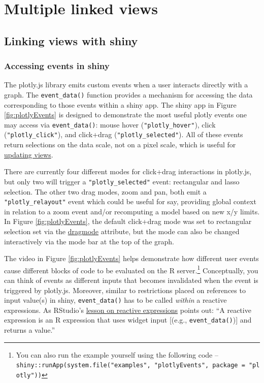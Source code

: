 \documentclass[12pt,]{isuthesis}
\let\rmarkdownfootnote\footnote%
\def\footnote{\protect\rmarkdownfootnote}
\begin{document}
\hypertarget{multiple-linked-views}{\section{Multiple linked
views}\label{multiple-linked-views}}

\hypertarget{linking-views-with-shiny}{\subsection{Linking views with
shiny}\label{linking-views-with-shiny}}

\subsubsection{Accessing events in
shiny}\label{accessing-events-in-shiny}

The plotly.js library emits custom events when a user interacts directly
with a graph. The \texttt{event\_data()} function provides a mechanism
for accessing the data corresponding to those events within a shiny app.
The shiny app in Figure \ref{fig:plotlyEvents} is designed to
demonstrate the most useful plotly events one may access via
\texttt{event\_data()}: mouse hover (\texttt{"plotly\_hover"}), click
(\texttt{"plotly\_click"}), and click+drag
(\texttt{"plotly\_selected"}). All of these events return selections on
the data scale, not on a pixel scale, which is useful for
\protect\hyperlink{updating-views}{updating views}.

There are currently four different modes for click+drag interactions in
plotly.js, but only two will trigger a \texttt{"plotly\_selected"}
event: rectangular and lasso selection. The other two drag modes, zoom
and pan, both emit a \texttt{"plotly\_relayout"} event which could be
useful for say, providing global context in relation to a zoom event
and/or recomputing a model based on new x/y limits. In Figure
\ref{fig:plotlyEvents}, the default click+drag mode was set to
rectangular selection set via the
\href{https://plot.ly/r/reference/\#layout-dragmode}{dragmode}
attribute, but the mode can also be changed interactively via the mode
bar at the top of the graph.

The video in Figure \ref{fig:plotlyEvents} helps demonstrate how
different user events cause different blocks of code to be evaluated on
the R server.\footnote{You can also run the example yourself using the
  following code --
  \texttt{shiny::runApp(system.file("examples",\ "plotlyEvents",\ package\ =\ "plotly"))}}
Conceptually, you can think of events as different inputs that becomes
invalidated when the event is triggered by plotly.js. Moreover, similar
to restrictions placed on references to input value(s) in shiny,
\texttt{event\_data()} has to be called \emph{within} a reactive
expressions. As RStudio's
\href{http://web.archive.org/web/20160405081516/http://shiny.rstudio.com/tutorial/lesson6/}{lesson
on reactive expressions} points out: ``A reactive expression is an R
expression that uses widget input {[}(e.g., \texttt{event\_data()}){]}
and returns a value.''
\end{document}
